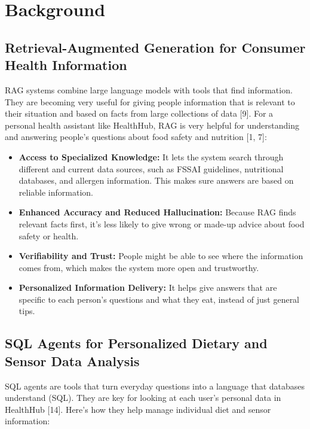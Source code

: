 \section{Background}

\subsection{Retrieval-Augmented Generation for Consumer Health Information}
RAG systems combine large language models with tools that find information. They are becoming very useful for giving people information that is relevant to their situation and based on facts from large collections of data [9]. For a personal health assistant like HealthHub, RAG is very helpful for understanding and answering people's questions about food safety and nutrition [1, 7]:

\begin{itemize}
    \item \textbf{Access to Specialized Knowledge:} It lets the system search through different and current data sources, such as FSSAI guidelines, nutritional databases, and allergen information. This makes sure answers are based on reliable information.
    \item \textbf{Enhanced Accuracy and Reduced Hallucination:} Because RAG finds relevant facts first, it's less likely to give wrong or made-up advice about food safety or health.
    \item \textbf{Verifiability and Trust:} People might be able to see where the information comes from, which makes the system more open and trustworthy.
    \item \textbf{Personalized Information Delivery:} It helps give answers that are specific to each person's questions and what they eat, instead of just general tips.
\end{itemize}

\subsection{SQL Agents for Personalized Dietary and Sensor Data Analysis}
SQL agents are tools that turn everyday questions into a language that databases understand (SQL). They are key for looking at each user's personal data in HealthHub [14]. Here's how they help manage individual diet and sensor information:

